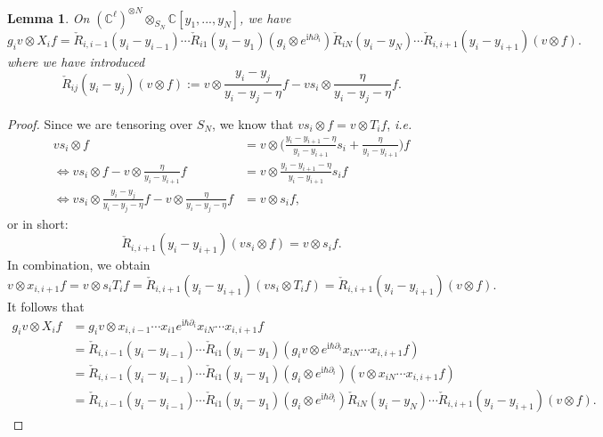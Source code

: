 \documentclass[11pt]{report}
\newtheorem{lemma}[theorem]{Lemma}
\theoremstyle{definition}
\theoremstyle{remark}
\theoremstyle{remark}
\newcommand{\C}{\mathbb{C}}
\newcommand{\I}{\mathrm{i}}
\begin{document}
\begin{lemma}\label{lemma:keyLemma}
On $(\C^\ell)^{\otimes N} \otimes_{S_N} \C[y_1,...,y_N]$, we have
\begin{equation*}
g_i v \otimes X_i f = \check R_{i,i-1}(y_i-y_{i-1}) \cdots \check R_{i1}(y_i-y_1) (g_i \otimes e^{\I \hbar \partial_i}) \check R_{iN}(y_i-y_N) \cdots \check R_{i,i+1}(y_i-y_{i+1}) (v \otimes f).
\end{equation*}
where we have introduced
\begin{equation*}
\check R_{ij}(y_i-y_j) (v \otimes f) := v \otimes \frac{y_i-y_j}{y_i-y_j-\eta} f - v s_i \otimes \frac{\eta}{y_i-y_j-\eta} f.
\end{equation*}
\end{lemma}

\begin{proof}
Since we are tensoring over $S_N$, we know that $v s_i \otimes f = v \otimes T_i f$, \emph{i.e.}
\begin{align*}
vs_i  \otimes f &= v \otimes \bigg( \frac{y_i-y_{i+1}-\eta}{y_i-y_{i+1}} s_i + \frac{\eta}{y_i-y_{i+1}} \bigg) f \\
\Leftrightarrow v s_i \otimes f - v \otimes \frac{\eta}{y_i-y_{i+1}} f &= v \otimes \frac{y_i-y_{i+1}-\eta}{y_i-y_{i+1}} s_i f \\
\Leftrightarrow v s_i \otimes \frac{y_i-y_j}{y_i-y_j-\eta} f - v \otimes \frac{\eta}{y_i-y_j-\eta} f &= v \otimes s_i f,
\end{align*}
or in short:
\begin{equation*}
\check R_{i,i+1}(y_i-y_{i+1}) (v s_i \otimes f) = v \otimes s_i f.
\end{equation*}
In combination, we obtain
\begin{equation*}
v \otimes x_{i,i+1} f = v \otimes s_i T_i f = \check R_{i,i+1}(y_i-y_{i+1}) (v s_i \otimes T_i f) = \check R_{i,i+1}(y_i-y_{i+1})(v \otimes f).
\end{equation*}
It follows that
\begin{align*}
g_i v \otimes X_i f
&= g_i v \otimes x_{i,i-1} \cdots x_{i1} e^{\I \hbar \partial_i} x_{iN} \cdots x_{i,i+1} f \\
&= \check R_{i,i-1}(y_i-y_{i-1}) \cdots \check R_{i1}(y_i-y_1) (g_i v \otimes e^{\I \hbar \partial_i} x_{iN} \cdots x_{i,i+1} f) \\
&= \check R_{i,i-1}(y_i-y_{i-1}) \cdots \check R_{i1}(y_i-y_1) (g_i \otimes e^{\I \hbar \partial_i}) (v \otimes x_{iN} \cdots x_{i,i+1} f) \\
&= \check R_{i,i-1}(y_i-y_{i-1}) \cdots \check R_{i1}(y_i-y_1) (g_i \otimes e^{\I \hbar \partial_i}) \check R_{iN}(y_i-y_N) \cdots \check R_{i,i+1}(y_i-y_{i+1}) (v \otimes f).
\end{align*}
\end{proof}
\end{document}
